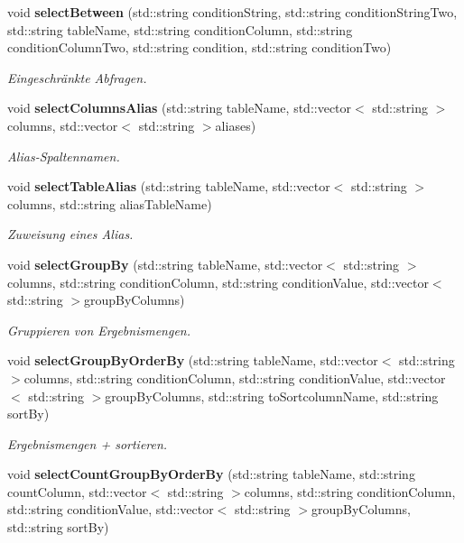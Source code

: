 \begin{DoxyCompactItemize}
void \textbf{ select\+Between} (std\+::string condition\+String, std\+::string condition\+String\+Two, std\+::string table\+Name, std\+::string condition\+Column, std\+::string condition\+Column\+Two, std\+::string condition, std\+::string condition\+Two)
\begin{DoxyCompactList}\small\item\em Eingeschränkte Abfragen. \end{DoxyCompactList}\item 
void \textbf{ select\+Columns\+Alias} (std\+::string table\+Name, std\+::vector$<$ std\+::string $>$columns, std\+::vector$<$ std\+::string $>$aliases)
\begin{DoxyCompactList}\small\item\em Alias-\/\+Spaltennamen. \end{DoxyCompactList}\item 
void \textbf{ select\+Table\+Alias} (std\+::string table\+Name, std\+::vector$<$ std\+::string $>$columns, std\+::string alias\+Table\+Name)
\begin{DoxyCompactList}\small\item\em Zuweisung eines Alias. \end{DoxyCompactList}\item 
void \textbf{ select\+Group\+By} (std\+::string table\+Name, std\+::vector$<$ std\+::string $>$columns, std\+::string condition\+Column, std\+::string condition\+Value, std\+::vector$<$ std\+::string $>$group\+By\+Columns)
\begin{DoxyCompactList}\small\item\em Gruppieren von Ergebnismengen. \end{DoxyCompactList}\item 
void \textbf{ select\+Group\+By\+Order\+By} (std\+::string table\+Name, std\+::vector$<$ std\+::string $>$columns, std\+::string condition\+Column, std\+::string condition\+Value, std\+::vector$<$ std\+::string $>$group\+By\+Columns, std\+::string to\+Sortcolumn\+Name, std\+::string sort\+By)
\begin{DoxyCompactList}\small\item\em Ergebnismengen + sortieren. \end{DoxyCompactList}\item 
void \textbf{ select\+Count\+Group\+By\+Order\+By} (std\+::string table\+Name, std\+::string count\+Column, std\+::vector$<$ std\+::string $>$columns, std\+::string condition\+Column, std\+::string condition\+Value, std\+::vector$<$ std\+::string $>$group\+By\+Columns, std\+::string sort\+By)

\end{DoxyCompactItemize}
